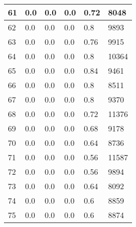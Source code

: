 \begin{longtable}{|l|l|l|l|l|l|}
61 & 0.0 & 0.0 & 0.0 & 0.72 & 8048 \\ \hline 
62 & 0.0 & 0.0 & 0.0 & 0.8 & 9893 \\ \hline 
63 & 0.0 & 0.0 & 0.0 & 0.76 & 9915 \\ \hline 
64 & 0.0 & 0.0 & 0.0 & 0.8 & 10364 \\ \hline 
65 & 0.0 & 0.0 & 0.0 & 0.84 & 9461 \\ \hline 
66 & 0.0 & 0.0 & 0.0 & 0.8 & 8511 \\ \hline 
67 & 0.0 & 0.0 & 0.0 & 0.8 & 9370 \\ \hline 
68 & 0.0 & 0.0 & 0.0 & 0.72 & 11376 \\ \hline 
69 & 0.0 & 0.0 & 0.0 & 0.68 & 9178 \\ \hline 
70 & 0.0 & 0.0 & 0.0 & 0.64 & 8736 \\ \hline 
71 & 0.0 & 0.0 & 0.0 & 0.56 & 11587 \\ \hline 
72 & 0.0 & 0.0 & 0.0 & 0.56 & 9894 \\ \hline 
73 & 0.0 & 0.0 & 0.0 & 0.64 & 8092 \\ \hline 
74 & 0.0 & 0.0 & 0.0 & 0.6 & 8859 \\ \hline 
75 & 0.0 & 0.0 & 0.0 & 0.6 & 8874 \\ \hline 
\end{longtable}